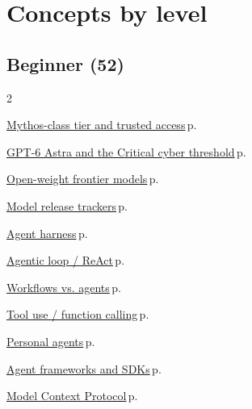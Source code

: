 \documentclass[10pt,a4paper,openany]{report}
\begin{document}
\chapter{Concepts by level}
\section{Beginner (52)}
\begin{multicols}{2}\small\raggedright
\hyperref[c:landscape-0]{Mythos-class tier and trusted access}\,{\color{muted}\scriptsize p.\,\pageref{c:landscape-0}}\par\vspace{1pt}
\hyperref[c:landscape-1]{GPT-6 Astra and the Critical cyber threshold}\,{\color{muted}\scriptsize p.\,\pageref{c:landscape-1}}\par\vspace{1pt}
\hyperref[c:landscape-3]{Open-weight frontier models}\,{\color{muted}\scriptsize p.\,\pageref{c:landscape-3}}\par\vspace{1pt}
\hyperref[c:landscape-4]{Model release trackers}\,{\color{muted}\scriptsize p.\,\pageref{c:landscape-4}}\par\vspace{1pt}
\hyperref[c:agents-0]{Agent harness}\,{\color{muted}\scriptsize p.\,\pageref{c:agents-0}}\par\vspace{1pt}
\hyperref[c:agents-3]{Agentic loop / ReAct}\,{\color{muted}\scriptsize p.\,\pageref{c:agents-3}}\par\vspace{1pt}
\hyperref[c:agents-4]{Workflows vs. agents}\,{\color{muted}\scriptsize p.\,\pageref{c:agents-4}}\par\vspace{1pt}
\hyperref[c:agents-5]{Tool use / function calling}\,{\color{muted}\scriptsize p.\,\pageref{c:agents-5}}\par\vspace{1pt}
\hyperref[c:agents-10]{Personal agents}\,{\color{muted}\scriptsize p.\,\pageref{c:agents-10}}\par\vspace{1pt}
\hyperref[c:agents-12]{Agent frameworks and SDKs}\,{\color{muted}\scriptsize p.\,\pageref{c:agents-12}}\par\vspace{1pt}
\hyperref[c:protocols-0]{Model Context Protocol}\,{\color{muted}\scriptsize p.\,\pageref{c:protocols-0}}\par\vspace{1pt}

\end{multicols}
\end{document}
